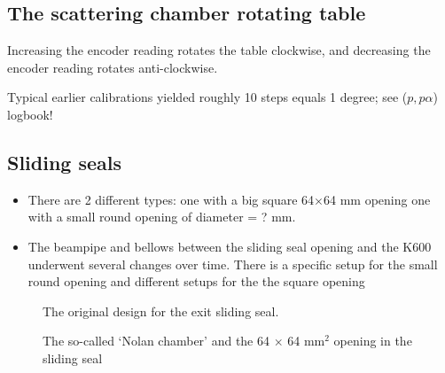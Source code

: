 \documentclass[11pt]{report}
\begin{document}
\subsection{The scattering chamber rotating table}

Increasing the encoder reading rotates the table clockwise, and decreasing the
encoder reading rotates anti-clockwise.

Typical earlier calibrations yielded roughly 10 steps equals 1 degree; see ($p,p \alpha$) logbook!


\subsection{Sliding seals}

\begin{itemize}
\item There are 2 different types: one with a big square 64$\times$64 mm opening
one with a small round opening of diameter = ? mm.

\item The beampipe and bellows between the sliding seal opening and the 
K600 underwent several changes over time.
There is a specific setup for the small round opening
and different setups for the the square opening


\end{itemize}

\begin{figure}[!ht]
\centerline{\vspace{0cm}\hspace{0cm}
}
\centering
\caption{The original design for the exit sliding seal.}
\label{fig:scatchamber-exit-original}
\end{figure} 

\begin{figure}[!ht]
\centerline{\vspace{0cm}\hspace{0cm}
}
\centering
\caption{The so-called `Nolan chamber' and the 64 $\times$ 64 mm$^2$ opening in the sliding seal}
\label{fig:scatchamber-nolanchamber}
\end{figure} 
\end{document}
